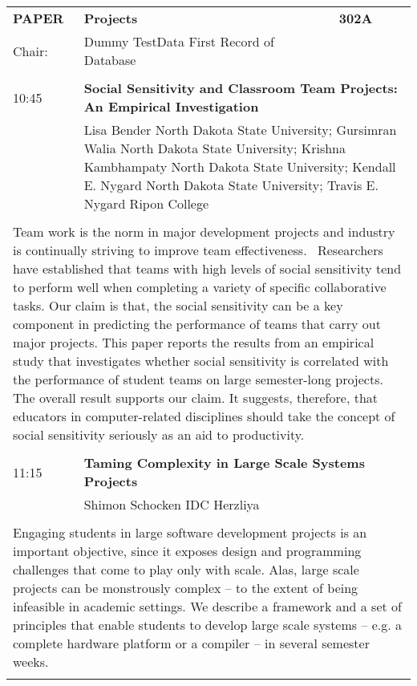 \documentclass[]{article}
\begin{document}
\newpage
\begin{longtable}{p{1in}p{3in}p{1in}}
{\Large \textbf{PAPER}} & {\Large\textbf{Projects}} & \textbf{302A} \\
Chair:  & Dummy TestData First Record of Database & \\ \\

10:45 & \multicolumn{2}{p{3.75in}}{\raggedright\large\textbf{Social Sensitivity and Classroom Team Projects: An Empirical Investigation}} \\
& \multicolumn{2}{p{3.75in}}{Lisa Bender North Dakota State University;
Gursimran Walia North Dakota State University;
Krishna Kambhampaty North Dakota State University;
Kendall E. Nygard North Dakota State University;
Travis E. Nygard Ripon College
} \\ \\
\multicolumn{3}{p{5in}}{Team work is the norm in major development projects and industry is continually striving to improve team effectiveness.  Researchers have established that teams with high levels of social sensitivity tend to perform well when completing a variety of specific collaborative tasks. Our claim is that, the social sensitivity can be a key component in predicting the performance of teams that carry out major projects. This paper reports the results from an empirical study that investigates whether social sensitivity is correlated with the performance of student teams on large semester-long projects. The overall result supports our claim. It suggests, therefore, that educators in computer-related disciplines should take the concept of social sensitivity seriously as an aid to productivity.} \\ \\

11:15 & \multicolumn{2}{p{3.75in}}{\large\textbf{Taming Complexity in Large Scale Systems Projects}} \\ 
& \multicolumn{2}{p{3.75in}}{Shimon Schocken IDC Herzliya} \\ \\
\multicolumn{3}{p{5in}}{Engaging students in large software development projects is an important objective, since it exposes design and programming challenges that come to play only with scale. Alas, large scale projects can be monstrously complex – to the extent of being infeasible in academic settings. We describe a framework and a set of principles that enable students to develop large scale systems – e.g. a complete hardware platform or a compiler – in several semester weeks.} \\ \\


\end{longtable}
\end{document}
